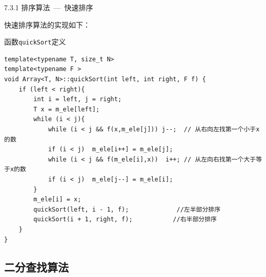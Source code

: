 \begin{frame}[fragile]{7.3.1 排序算法\normalsize{~---~快速排序}}

快速排序算法的实现如下：
\vspace{-4mm}
\begin{blueblock}{函数\texttt{quickSort}定义}
\begin{lstlisting}[moreemph={Array,T,F}]
template<typename T, size_t N>
template<typename F >
void Array<T, N>::quickSort(int left, int right, F f) {
	if (left < right){
		int i = left, j = right;
		T x = m_ele[left];
		while (i < j){
			while (i < j && f(x,m_ele[j])) j--;  // 从右向左找第一个小于x的数
			if (i < j)	m_ele[i++] = m_ele[j];
			while (i < j && f(m_ele[i],x))	i++; // 从左向右找第一个大于等于x的数
			if (i < j)	m_ele[j--] = m_ele[i];
		}
		m_ele[i] = x;
		quickSort(left, i - 1, f);             //左半部分排序
		quickSort(i + 1, right, f);           //右半部分排序
	}
}
\end{lstlisting}
\end{blueblock}

\end{frame}
\subsection{二分查找算法}


